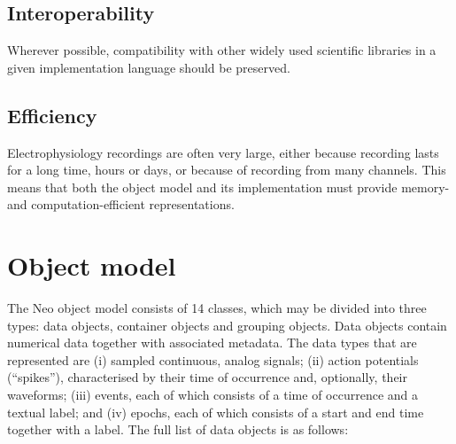 \documentclass{frontiers}
\begin{document}
\subsection{Interoperability}

Wherever possible, compatibility with other widely used scientific libraries in a given implementation language should be preserved.

\subsection{Efficiency}

Electrophysiology recordings are often very large, either because recording lasts for a long time, hours or days, or because of recording from many channels. This means that both the object model and its implementation must provide memory- and computation-efficient representations.


\section{Object model}


The Neo object model consists of 14 classes, which may be divided into three types: data objects, container objects and grouping objects.
Data objects contain numerical data together with associated metadata.
The data types that are represented are 
(i) sampled continuous, analog signals; 
(ii) action potentials (``spikes''), characterised by their time of occurrence and, optionally, their waveforms; 
(iii) events, each of which consists of a time of occurrence and a textual label; and 
(iv) epochs, each of which consists of a start and end time together with a label.
The full list of data objects is as follows:
\end{document}
